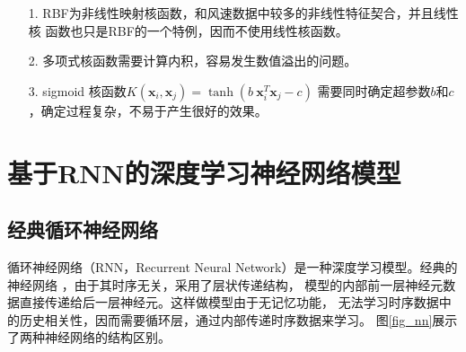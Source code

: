 \documentclass[AutoFakeBold]{LZUThesis}
\begin{document}
\begin{itemize}
\item[1. ] RBF为非线性映射核函数，和风速数据中较多的非线性特征契合，并且线性核
函数也只是RBF的一个特例，因而不使用线性核函数。
\item[2. ] 多项式核函数需要计算内积，容易发生数值溢出的问题。
\item[3. ] sigmoid 核函数$K(\mathbf x_i,\mathbf x_j)=\tanh(b\:\mathbf x_i^T\mathbf x_j-c)$
需要同时确定超参数$b$和$c$，确定过程复杂，不易于产生很好的效果。
\end{itemize}

\section{基于RNN的深度学习神经网络模型}
\subsection{经典循环神经网络}
循环神经网络（RNN，Recurrent Neural Network）是一种深度学习模型。经典的神经网络
，由于其时序无关，采用了层状传递结构，
模型的内部前一层神经元数据直接传递给后一层神经元。这样做模型由于无记忆功能，
无法学习时序数据中的历史相关性，因而需要循环层，通过内部传递时序数据来学习。
图\ref{fig_nn}展示了两种神经网络的结构区别。
\end{document}
